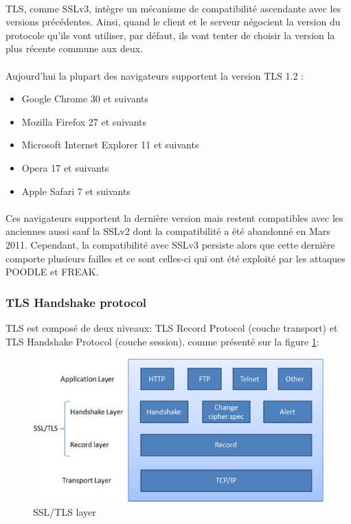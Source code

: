 \paragraph{}
TLS, comme SSLv3, intègre un mécanisme de compatibilité ascendante avec les versions précédentes. Ainsi, quand le client et le serveur négocient la version du protocole qu'ils vont utiliser, par défaut, ils vont tenter de choisir la version la plus récente commune aux deux. 

\paragraph{}
Aujourd'hui la plupart des navigateurs supportent la version TLS 1.2 : 
\begin{itemize}
\item Google Chrome 30 et suivants
\item Mozilla Firefox 27 et suivants
\item Microsoft Internet Explorer 11 et suivants
\item Opera 17 et suivants
\item Apple Safari 7 et suivants
\end{itemize}

\paragraph{}
Ces navigateurs supportent la dernière version mais restent compatibles avec les anciennes aussi sauf la SSLv2 dont la compatibilité a été abandonné en Mars 2011. Cependant, la compatibilité avec SSLv3 persiste alors que cette dernière comporte plusieurs failles et ce sont celles-ci qui ont été exploité par les attaques POODLE et FREAK.  


\subsubsection{TLS Handshake protocol}

TLS est composé de deux niveaux: TLS Record Protocol (couche transport) et TLS Handshake Protocol (couche session), comme présenté sur la figure \ref{ssl-tls-diag}: \\

\begin{figure}[H]
  \centering
  \includegraphics[scale=0.6]{img/ssl-tls-diag.jpg}
  \caption{SSL/TLS layer}
  \label{ssl-tls-diag}
\end{figure}  


